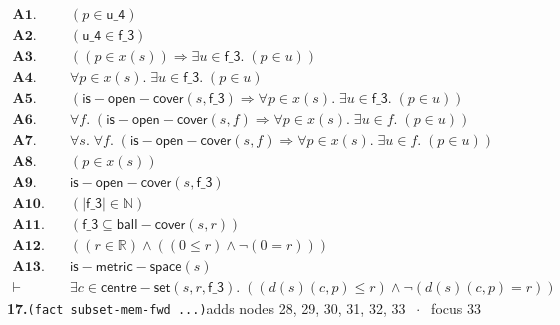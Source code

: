 \documentclass[11pt]{article}
\begin{document}
\begin{align*}
  \mathbf{A1.}\quad & (p \in \mathsf{u\_4}) \\
  \mathbf{A2.}\quad & (\mathsf{u\_4} \in \mathsf{f\_3}) \\
  \mathbf{A3.}\quad & ((p \in x(s)) \Rightarrow \exists u \in \mathsf{f\_3}.\; (p \in u)) \\
  \mathbf{A4.}\quad & \forall p \in x(s).\; \exists u \in \mathsf{f\_3}.\; (p \in u) \\
  \mathbf{A5.}\quad & (\mathsf{is{-}open{-}cover}(s, \mathsf{f\_3}) \Rightarrow \forall p \in x(s).\; \exists u \in \mathsf{f\_3}.\; (p \in u)) \\
  \mathbf{A6.}\quad & \forall f.\; (\mathsf{is{-}open{-}cover}(s, f) \Rightarrow \forall p \in x(s).\; \exists u \in f.\; (p \in u)) \\
  \mathbf{A7.}\quad & \forall s.\; \forall f.\; (\mathsf{is{-}open{-}cover}(s, f) \Rightarrow \forall p \in x(s).\; \exists u \in f.\; (p \in u)) \\
  \mathbf{A8.}\quad & (p \in x(s)) \\
  \mathbf{A9.}\quad & \mathsf{is{-}open{-}cover}(s, \mathsf{f\_3}) \\
  \mathbf{A10.}\quad & (|\mathsf{f\_3}| \in \mathbb{N}) \\
  \mathbf{A11.}\quad & (\mathsf{f\_3} \subseteq \mathsf{ball{-}cover}(s, r)) \\
  \mathbf{A12.}\quad & ((r \in \mathbb{R}) \wedge ((0 \leq r) \wedge \neg (0 = r))) \\
  \mathbf{A13.}\quad & \mathsf{is{-}metric{-}space}(s) \\
  \vdash\quad & \exists c \in \mathsf{centre{-}set}(s, r, \mathsf{f\_3}).\; ((d(s)(c, p) \leq r) \wedge \neg (d(s)(c, p) = r))
\end{align*}
\medskip\noindent\textbf{17.}\quad \texttt{(fact subset-mem-fwd ...)}\hfill{\small adds nodes 28, 29, 30, 31, 32, 33 $\;\cdot\;$ focus 33}\\[2pt]
\end{document}
